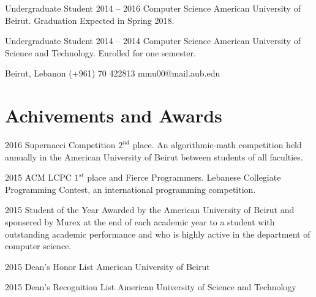 \documentclass{tccv}
\begin{document}
\begin{yearlist}

\item[Undergraduate Student]{2014 -- 2016}
     {Computer Science} 
     {American University of Beirut. Graduation Expected in Spring 2018.}


\item[Undergraduate Student]{2014 -- 2014}
     {Computer Science} 
     {American University of Science and Technology. Enrolled for one semester.}

\end{yearlist}

\personal
    {Beirut, Lebanon}
    {(+961) 70 422813}
    {mmu00@mail.aub.edu}




\section{Achivements and Awards}

\begin{yearlist}

\item{2016}
     {Supernacci Competition}
     {$2^{nd}$ place. An algorithmic-math competition held annually in the American University of Beirut between students of all faculties.}

\item{2015}
     {ACM LCPC}
     {$1^{st}$ place and Fierce Programmers. Lebanese Collegiate Programming Contest, an international programming competition.}

\item{2015}
     {Student of the Year}
     {Awarded by the American University of Beirut and sponsered by Murex at the end of each academic year to a student with outstanding academic performance and who is highly active in the department of computer science.}

\item{2015}
     {Dean's Honor List}
     {American University of Beirut}

\item{2015}
     {Dean's Recognition List}
     {American University of Science and Technology}

\end{yearlist}
\end{document}
